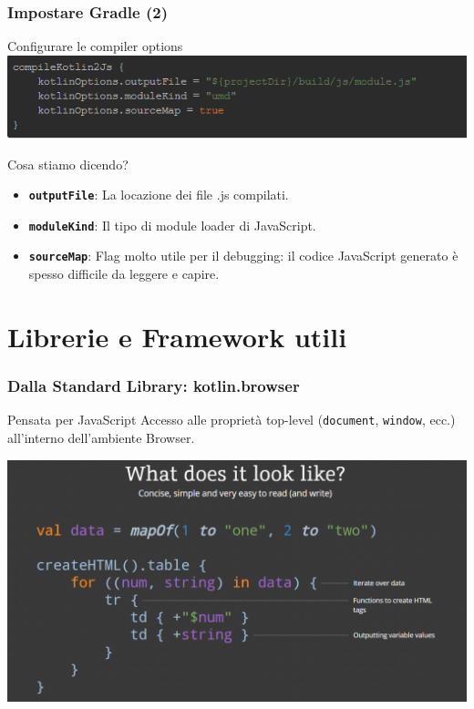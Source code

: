     \begin{frame}
      \frametitle{Impostare Gradle (2)}
      \begin{block}{Configurare le compiler options}
        \includegraphics[scale=0.67]{Kt2JsGradle}
      \end{block}
      \begin{block}{Cosa stiamo dicendo?}
        \begin{itemize}
          \item \textbf{\texttt{outputFile}}: La locazione dei file .js compilati.
          \item \textbf{\texttt{moduleKind}}: Il tipo di module loader di JavaScript.
          \item \textbf{\texttt{sourceMap}}: Flag molto utile per il debugging: il codice JavaScript generato è spesso difficile da leggere e capire.
        \end{itemize}
      \end{block}
    \end{frame}

    \section{Librerie e Framework utili}
    \begin{frame}
      \frametitle{Dalla Standard Library: \textbf{kotlin.browser}}
      \begin{block}{Pensata per JavaScript}
        Accesso alle proprietà top-level (\texttt{document}, \texttt{window}, ecc.) all'interno dell'ambiente Browser.
      \end{block}
      \begin{center}
        \includegraphics[scale=0.33]{KotlinHtmlX}
      \end{center}
    \end{frame}

